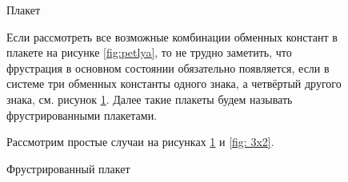 \documentclass[utf8, babel, sor, jor, amsmath, amssymb, reprint]{elsarticle} %
\begin{document}
\begin{figure}[h]
	\centering
	\begin{minipage}{0.3\textwidth}
		\centering
		\caption{Плакет}
		\label{fig:petlya}
	\end{minipage}

Если рассмотреть все возможные комбинации обменных констант в плакете на рисунке \ref{fig:petlya}, то не трудно заметить, что фрустрация в основном состоянии обязательно появляется, если в системе три обменных константы одного знака, а четвёртый другого знака, см. рисунок \ref{fig:struna}. Далее такие плакеты будем называть фрустрированными плакетами.

\begin{minipage}{0.3\textwidth}
	\centering
	\caption{Фрустрированный плакет}
	\label{fig:struna}
\end{minipage}

Рассмотрим простые случаи на рисунках  \ref{fig:struna} и \ref{fig: 3x2}.


\end{figure}
\end{document}
